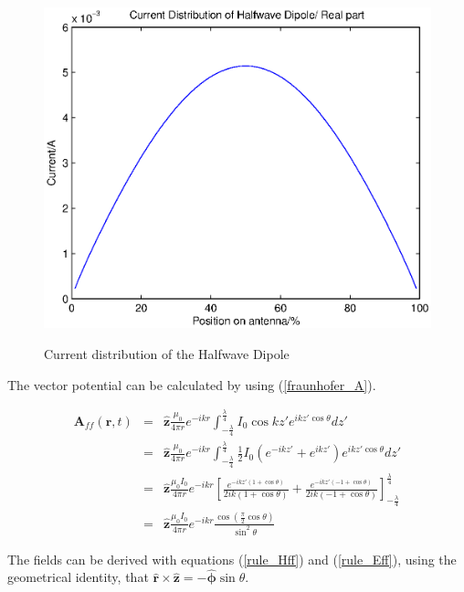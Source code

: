 \documentclass[a4paper,14pt]{extbook}
\begin{document}
\begin{figure}
  \includegraphics[width=12cm]{phase_distr_shd}\\
  \caption{Current distribution of the Halfwave Dipole}\label{fig_curr_distr_hwd}
\end{figure}

The vector potential can be calculated by using (\ref{fraunhofer_A}).

\begin{eqnarray}\label{hwd_A_solution}
 \mathbf{A}_{ff}(\mathbf{r},t) &=&\mathbf{ \hat{z}} \frac{\mu_0}{4 \pi r} e^{-ikr} \int_{-\frac{\lambda}{4}}^{\frac{\lambda}{4}} I_0 \cos kz' e^{ikz'\cos \theta } dz'\\
&=& \mathbf{\hat{z}} \frac{\mu_0}{4 \pi r} e^{-ikr} \int_{-\frac{\lambda}{4}}^{\frac{\lambda}{4}} \frac{1}{2} I_0 (e^{-ikz'}+e^{ikz'}) e^{ikz'\cos \theta } dz'\nonumber \\
&=& \mathbf{\hat{z} }\frac{\mu_0 I_0}{4 \pi r} e^{-ikr} \left[ \frac{e^{-ikz' (1+ \cos \theta ) }}{2ik(1+ \cos \theta )} + \frac{e^{-ikz' (-1+ \cos \theta )} }{2ik(-1+ \cos \theta )} \right]_{-\frac{\lambda}{4}}^{\frac{\lambda}{4}} \nonumber \\
&=& \mathbf{\hat{z}} \frac{\mu_0 I_0}{4 \pi r} e^{-ikr} \frac{\cos (\frac{\pi}{2} \cos \theta)}{\sin^2 \theta} \nonumber
\end{eqnarray}

The fields can be derived with equations (\ref{rule_Hff}) and (\ref{rule_Eff}), using the geometrical identity, that $\mathbf{\hat{r}} \times \mathbf{\hat{z}}=- \mathbf{\hat{\phi}} \sin \theta$.
\end{document}
